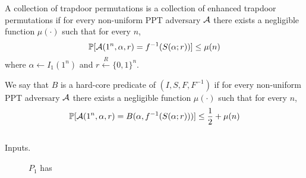 \begin{definition} A collection of {\sf trapdoor permutations} is a collection of {\sf enhanced trapdoor permutations} if for every non-uniform PPT adversary $\mathcal{A}$ there exists a negligible function $\mu(\cdot)$ such that for every $n$,
$$\mathop{\mathbb P\/}[\mathcal{A}(1^n,\alpha,r)=f^{-1}(S(\alpha;r))]\leq\mu(n)$$
where $\alpha\leftarrow I_1(1^n)$ and $r\stackrel{R}{\leftarrow}\{0,1\}^n$.
\end{definition}

\begin{definition} We say that $B$ is a {\sf hard-core predicate} of $(I,S,F,F^{-1})$ if for every non-uniform PPT adversary $\mathcal{A}$ there exists a negligible function $\mu(\cdot)$ such that for every $n$,
$$\mathop{\mathbb P\/}[\mathcal{A}(1^n,\alpha,r)=B(\alpha, f^{-1}(S(\alpha;r)))]\leq\frac{1}{2}+\mu(n)$$
\end{definition}
\begin{adjustbox}{minipage=\linewidth,fbox}
\begin{protocol}$ $
    \begin{description}
        \item[Inputs.] $P_1$ has
    \end{description}
\end{protocol}
\end{adjustbox}
\nocite{*} 
